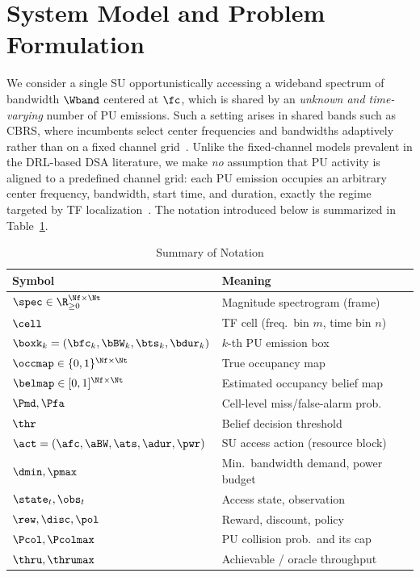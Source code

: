 \section{System Model and Problem Formulation}
\label{sec:system_model}

We consider a single SU opportunistically accessing a
wideband spectrum of bandwidth $\Wband$ centered at $\fc$, which is
shared by an \emph{unknown and time-varying} number of PU
emissions. Such a setting arises in shared bands such as CBRS, where
incumbents select center frequencies and bandwidths adaptively rather than on
a fixed channel grid~\cite{sohul2015cbrs,xing2007dsa}. Unlike the
fixed-channel models prevalent in the DRL-based DSA literature, we make
\emph{no} assumption that PU activity is aligned to a predefined channel
grid: each PU emission occupies an arbitrary center frequency, bandwidth,
start time, and duration, exactly the regime targeted by TF
localization~\cite{prasad2020,zhao2025trtfl_ssl}. The notation introduced
below is summarized in Table~\ref{tab:notation}.

\begin{table}[t]
\centering
\caption{Summary of Notation}
\label{tab:notation}
\begin{tabular}{ll}
\toprule
Symbol & Meaning \\
\midrule
$\spec\in\R_{\ge0}^{\Nf\times\Nt}$ & Magnitude spectrogram (frame) \\
$\cell$ & TF cell (freq.\ bin $m$, time bin $n$) \\
$\boxk_k=(\bfc_k,\bBW_k,\bts_k,\bdur_k)$ & $k$-th PU emission box \\
$\occmap\in\{0,1\}^{\Nf\times\Nt}$ & True occupancy map \\
$\belmap\in[0,1]^{\Nf\times\Nt}$ & Estimated occupancy belief map \\
$\Pmd,\Pfa$ & Cell-level miss/false-alarm prob.\ \\
$\thr$ & Belief decision threshold \\
$\act=(\afc,\aBW,\ats,\adur,\pwr)$ & SU access action (resource block) \\
$\dmin,\pmax$ & Min.\ bandwidth demand, power budget \\
$\state_t,\obs_t$ & Access state, observation \\
$\rew,\disc,\pol$ & Reward, discount, policy \\
$\Pcol,\Pcolmax$ & PU collision prob.\ and its cap \\
$\thru,\thrumax$ & Achievable / oracle throughput \\
\bottomrule
\end{tabular}
\end{table}

